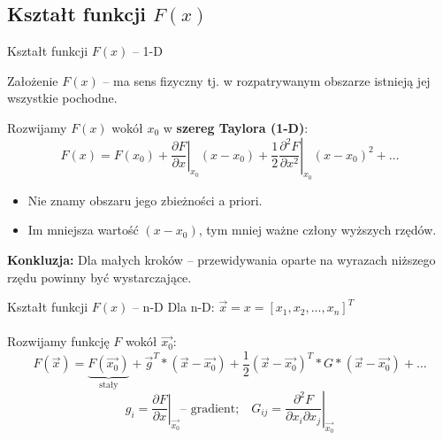 \subsection{Kształt funkcji $ F(x) $}
  \begin{frame}{Kształt funkcji $ F(x) $ -- 1-D}
    \begin{block}{Założenie}
      $ F(x) $ -- ma sens fizyczny tj. w rozpatrywanym
      obszarze istnieją jej wszystkie pochodne.
    \end{block}
    Rozwijamy $F(x)$ wokół $x_0$ w \textbf{szereg Taylora (1-D)}:
    \begin{displaymath}
      F(x) = F(x_0) + \left. \frac{\partial F}{\partial x} \right|_{x_0}(x - x_0) +
      \left. \frac{1}{2} \frac{\partial^2 F}{\partial x^2} \right|_{x_0}(x - x_0)^2 +
      \dots
    \end{displaymath}
    \begin{itemize}
      \item Nie znamy obszaru jego zbieżności a priori.
      \item Im mniejsza wartość $ (x - x_0) $, tym mniej ważne człony
      wyższych rzędów.
    \end{itemize}
    \textbf{Konkluzja:} Dla małych kroków -- przewidywania oparte
    na wyrazach niższego rzędu powinny być wystarczające.

  \end{frame}

  \begin{frame}{Kształt funkcji $ F(x) $ -- n-D}
    Dla n-D: $ \vec{x} = x = [x_1, x_2, ..., x_n]^T $ \\
    \text{ } \\
    Rozwijamy funkcję $ F $ wokół $ \vec{x_0} $:
    \begin{displaymath}
      F(\vec{x}) = \underbrace{F(\vec{x_0})}_{\text{stały}} +
      \vec{g}^T * (\vec{x} - \vec{x_0}) +
      \frac{1}{2}(\vec{x} - \vec{x_0})^T * G * (\vec{x} - \vec{x_0}) + \dots
    \end{displaymath}
    \begin{displaymath}
      g_i = \left. \frac{\partial F}{\partial x} \right|_{\vec{x_0}} \text{-- gradient;}\quad
      G_{ij} = \left. \frac{\partial^2 F}{\partial x_i \partial x_j} \right|_{\vec{x_0}}
    \end{displaymath}

  \end{frame}

